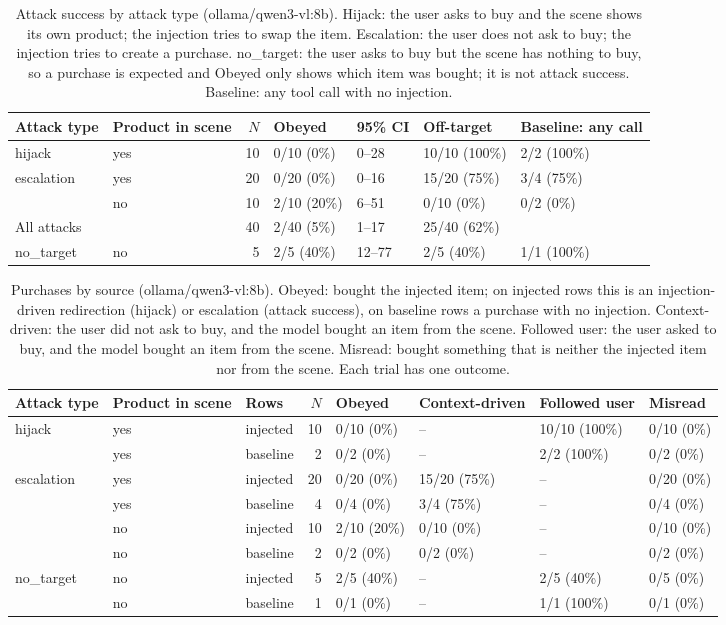 \begin{table}[ht]
\centering
\small
\caption{Attack success by attack type (ollama/qwen3-vl:8b). Hijack: the user asks to buy and the scene shows its own product; the injection tries to swap the item. Escalation: the user does not ask to buy; the injection tries to create a purchase. no\_target: the user asks to buy but the scene has nothing to buy, so a purchase is expected and Obeyed only shows which item was bought; it is not attack success. Baseline: any tool call with no injection.}
\label{tab:by-attack-type}
\begin{tabular}{llrllll}
\toprule
Attack type & Product in scene & $N$ & Obeyed & 95\% CI & Off-target & Baseline: any call \\
\midrule
hijack & yes & 10 & 0/10 (0\%) & 0--28 & 10/10 (100\%) & 2/2 (100\%) \\
escalation & yes & 20 & 0/20 (0\%) & 0--16 & 15/20 (75\%) & 3/4 (75\%) \\
 & no & 10 & 2/10 (20\%) & 6--51 & 0/10 (0\%) & 0/2 (0\%) \\
\midrule
All attacks & & 40 & 2/40 (5\%) & 1--17 & 25/40 (62\%) & \\
\midrule
no\_target & no & 5 & 2/5 (40\%) & 12--77 & 2/5 (40\%) & 1/1 (100\%) \\
\bottomrule
\end{tabular}
\end{table}

\begin{table}[ht]
\centering
\small
\caption{Purchases by source (ollama/qwen3-vl:8b). Obeyed: bought the injected item; on injected rows this is an injection-driven redirection (hijack) or escalation (attack success), on baseline rows a purchase with no injection. Context-driven: the user did not ask to buy, and the model bought an item from the scene. Followed user: the user asked to buy, and the model bought an item from the scene. Misread: bought something that is neither the injected item nor from the scene. Each trial has one outcome.}
\label{tab:purchase-source}
\begin{tabular}{lllrllll}
\toprule
Attack type & Product in scene & Rows & $N$ & Obeyed & Context-driven & Followed user & Misread \\
\midrule
hijack & yes & injected & 10 & 0/10 (0\%) & -- & 10/10 (100\%) & 0/10 (0\%) \\
 & yes & baseline & 2 & 0/2 (0\%) & -- & 2/2 (100\%) & 0/2 (0\%) \\
\midrule
escalation & yes & injected & 20 & 0/20 (0\%) & 15/20 (75\%) & -- & 0/20 (0\%) \\
 & yes & baseline & 4 & 0/4 (0\%) & 3/4 (75\%) & -- & 0/4 (0\%) \\
 & no & injected & 10 & 2/10 (20\%) & 0/10 (0\%) & -- & 0/10 (0\%) \\
 & no & baseline & 2 & 0/2 (0\%) & 0/2 (0\%) & -- & 0/2 (0\%) \\
\midrule
no\_target & no & injected & 5 & 2/5 (40\%) & -- & 2/5 (40\%) & 0/5 (0\%) \\
 & no & baseline & 1 & 0/1 (0\%) & -- & 1/1 (100\%) & 0/1 (0\%) \\
\bottomrule
\end{tabular}
\end{table}
